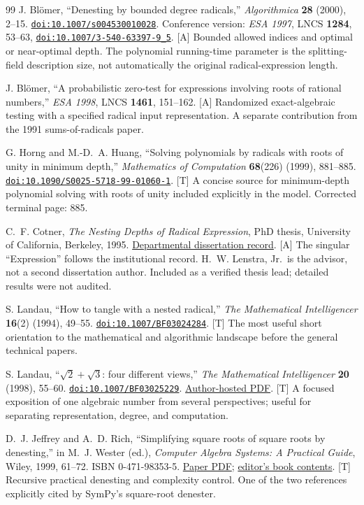 \documentclass[11pt,a4paper]{article}
\numberwithin{equation}{section}
\theoremstyle{definition}\newtheorem{definition}[theorem]{Definition}
\theoremstyle{remark}\newtheorem{remark}[theorem]{Remark}
\newcommand{\doi}[1]{\href{https://doi.org/#1}{\nolinkurl{doi:#1}}}
\newcommand{\access}[2]{\href{#1}{#2}}
\newcommand{\status}[1]{\textsf{\footnotesize[#1]}}
\begin{document}
\begin{thebibliography}{99}
 J. Bl\"omer, ``Denesting by bounded degree radicals,'' \emph{Algorithmica} \textbf{28} (2000), 2--15. \doi{10.1007/s004530010028}. Conference version: \emph{ESA 1997}, LNCS \textbf{1284}, 53--63, \doi{10.1007/3-540-63397-9_5}. \status{A}
Bounded allowed indices and optimal or near-optimal depth. The polynomial running-time parameter is the splitting-field description size, not automatically the original radical-expression length.

 J. Bl\"omer, ``A probabilistic zero-test for expressions involving roots of rational numbers,'' \emph{ESA 1998}, LNCS \textbf{1461}, 151--162. \status{A}
Randomized exact-algebraic testing with a specified radical input representation. A separate contribution from the 1991 sums-of-radicals paper.

 G. Horng and M.-D.~A. Huang, ``Solving polynomials by radicals with roots of unity in minimum depth,'' \emph{Mathematics of Computation} \textbf{68}(226) (1999), 881--885. \doi{10.1090/S0025-5718-99-01060-1}. \status{T}
A concise source for minimum-depth polynomial solving with roots of unity included explicitly in the model. Corrected terminal page: 885.

 C.~F. Cotner, \emph{The Nesting Depths of Radical Expression}, PhD thesis, University of California, Berkeley, 1995.
\access{https://math.berkeley.edu/publications/nesting-depths-radical-expression}{Departmental dissertation record}. \status{A}
The singular ``Expression'' follows the institutional record. H.~W. Lenstra, Jr.\ is the advisor, not a second dissertation author. Included as a verified thesis lead; detailed results were not audited.

 S. Landau, ``How to tangle with a nested radical,'' \emph{The Mathematical Intelligencer} \textbf{16}(2) (1994), 49--55. \doi{10.1007/BF03024284}. \status{T}
The most useful short orientation to the mathematical and algorithmic landscape before the general technical papers.

 S. Landau, ``$\sqrt2+\sqrt3$: four different views,'' \emph{The Mathematical Intelligencer} \textbf{20} (1998), 55--60. \doi{10.1007/BF03025229}.
\access{https://privacyink.org/pdf/Sqrt2+Sqrt3.pdf}{Author-hosted PDF}. \status{T}
A focused exposition of one algebraic number from several perspectives; useful for separating representation, degree, and computation.

 D.~J. Jeffrey and A.~D. Rich, ``Simplifying square roots of square roots by denesting,'' in M.~J. Wester (ed.), \emph{Computer Algebra Systems: A Practical Guide}, Wiley, 1999, 61--72. ISBN 0-471-98353-5.
\access{https://cybertester.com/data/denest.pdf}{Paper PDF}; \access{https://math.unm.edu/~wester/cas/book/contents.html}{editor's book contents}. \status{T}
Recursive practical denesting and complexity control. One of the two references explicitly cited by SymPy's square-root denester.


\end{thebibliography}
\end{document}
